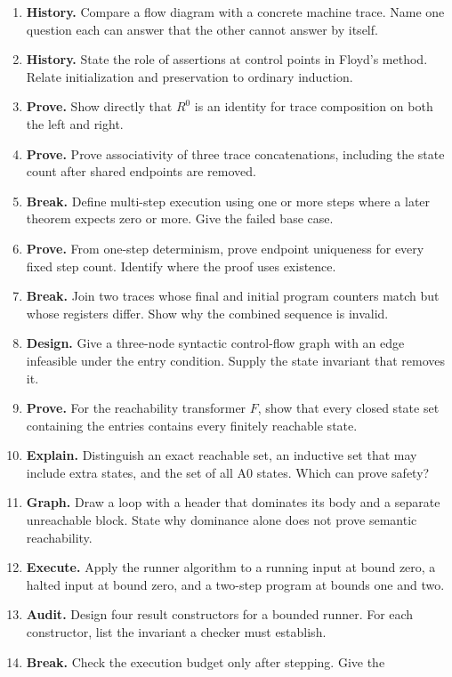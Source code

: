 \begin{enumerate}
set.
\item \textbf{History.} Compare a flow diagram with a concrete machine trace.
Name one question each can answer that the other cannot answer by itself.
\item \textbf{History.} State the role of assertions at control points in
Floyd's method. Relate initialization and preservation to ordinary induction.
\item \textbf{Prove.} Show directly that \(R^0\) is an identity for trace
composition on both the left and right.
\item \textbf{Prove.} Prove associativity of three trace concatenations,
including the state count after shared endpoints are removed.
\item \textbf{Break.} Define multi-step execution using one or more steps
where a later theorem expects zero or more. Give the failed base case.
\item \textbf{Prove.} From one-step determinism, prove endpoint uniqueness for
every fixed step count. Identify where the proof uses existence.
\item \textbf{Break.} Join two traces whose final and initial program counters
match but whose registers differ. Show why the combined sequence is invalid.
\item \textbf{Design.} Give a three-node syntactic control-flow graph with an
edge infeasible under the entry condition. Supply the state invariant that
removes it.
\item \textbf{Prove.} For the reachability transformer \(F\), show that every
closed state set containing the entries contains every finitely reachable
state.
\item \textbf{Explain.} Distinguish an exact reachable set, an inductive
set that may include extra states, and the set of all A0 states. Which can prove safety?
\item \textbf{Graph.} Draw a loop with a header that dominates its body and a
separate unreachable block. State why dominance alone does not prove semantic
reachability.
\item \textbf{Execute.} Apply the runner algorithm to a running input at bound
zero, a halted input at bound zero, and a two-step program at bounds one and
two.
\item \textbf{Audit.} Design four result constructors for a bounded runner.
For each constructor, list the invariant a checker must establish.
\item \textbf{Break.} Check the execution budget only after stepping. Give the

\end{enumerate}
